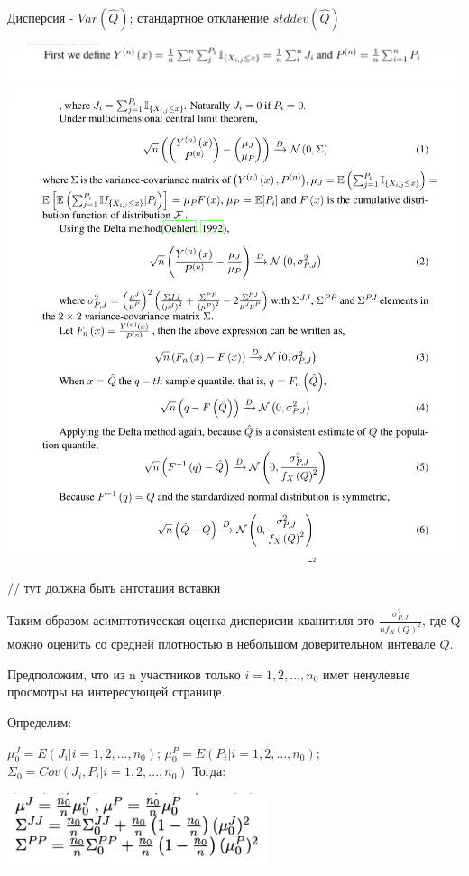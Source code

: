 \documentclass[specialist,
               substylefile = spbu_report.rtx,
               subf,href,colorlinks=true, 12pt]{disser}
\begin{document}
\begin{enumerate}
        Дисперсия - $Var(\widehat{Q} )$; стандартное откланение $stddev(\widehat{Q})$


        \includegraphics[width = 6in]{IMG_0086.jpg}
        \newline
        \includegraphics[width = 6in]{IMG_D1552B1059C6-1.jpeg}
        
        // тут должна быть антотация вставки 

        Таким образом асимптотическая оценка дисперисии кванитиля это $\frac{\sigma ^ 2_{P,J}}{nf_{X}(Q)^2}$,  где Q можно оценить со средней плотностью в небольшом доверительном интевале $\widehat{Q}$.

        Предположим, что из n участников только  $i = 1, 2,...,n_0$  имет ненулевые просмотры на интересующей странице.
        
        Определим: 
        
        $\mu_0^J = E(J_i|i =1,2, ... , n_0)$; $\mu_0^P = E(P_i|i =1,2, ... , n_0)$; $\Sigma_0 = Cov(J_i,P_i|i = 1,2,...,n_0)$
        Тогда:

        \includegraphics[width = 3in]{Снимок экрана 2023-10-16 в 22.09.59.png}


\end{enumerate}
\end{document}
